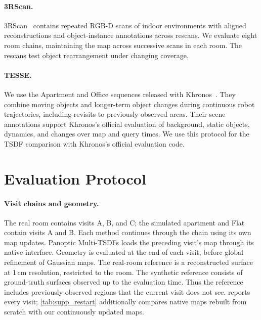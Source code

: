 \paragraph{3RScan.}
3RScan~\cite{wald2019rio} contains repeated RGB-D scans of indoor environments with aligned reconstructions
and object-instance annotations across rescans. We evaluate eight room chains, maintaining the map
across successive scans in each room. The rescans test object rearrangement under changing coverage.

\paragraph{TESSE.}
We use the Apartment and Office sequences released with Khronos~\cite{schmid2024khronos}. They combine
moving objects and longer-term object changes during continuous robot trajectories, including revisits
to previously observed areas. Their scene annotations support Khronos's official evaluation of
background, static objects, dynamics, and changes over map and query times. We use this protocol for
the TSDF comparison with Khronos's official evaluation code.

\section{Evaluation Protocol}

\paragraph{Visit chains and geometry.}
The real room contains visits A, B, and C; the simulated apartment and Flat contain visits A and B.
Each method continues through the chain using its own map updates. Panoptic Multi-TSDFs loads the preceding
visit's map through its native interface. Geometry is evaluated at the end of each visit, before global
refinement of Gaussian maps. The real-room reference is a reconstructed surface at 1\,cm resolution,
restricted to the room. The synthetic reference consists of ground-truth surfaces observed up to the evaluation
time. Thus the reference includes previously observed regions that the current visit does not see.
 reports every visit; \cref{tab:supp_restart} additionally compares native maps rebuilt
from scratch with our continuously updated maps.





